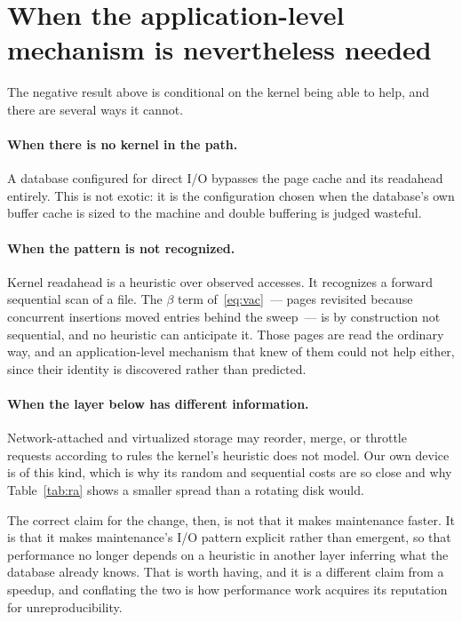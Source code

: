 \section{When the application-level mechanism is nevertheless needed}
\label{sec:when}

The negative result above is conditional on the kernel being able to help, and
there are several ways it cannot.

\paragraph{When there is no kernel in the path.} A database configured for direct
I/O bypasses the page cache and its readahead entirely. This is not exotic: it is
the configuration chosen when the database's own buffer cache is sized to the
machine and double buffering is judged wasteful.

\paragraph{When the pattern is not recognized.} Kernel readahead is a heuristic
over observed accesses. It recognizes a forward sequential scan of a file. The
$\beta$ term of~\eqref{eq:vac}~--- pages revisited because concurrent insertions
moved entries behind the sweep~--- is by construction not sequential, and no
heuristic can anticipate it. Those pages are read the ordinary way, and an
application-level mechanism that knew of them could not help either, since their
identity is discovered rather than predicted.

\paragraph{When the layer below has different information.} Network-attached and
virtualized storage may reorder, merge, or throttle requests according to rules
the kernel's heuristic does not model. Our own device is of this kind, which is
why its random and sequential costs are so close and why
Table~\ref{tab:ra} shows a smaller spread than a rotating disk would.

The correct claim for the change, then, is not that it makes maintenance faster.
It is that it makes maintenance's I/O pattern explicit rather than emergent, so
that performance no longer depends on a heuristic in another layer inferring what
the database already knows. That is worth having, and it is a different claim
from a speedup, and conflating the two is how performance work acquires its
reputation for unreproducibility.

